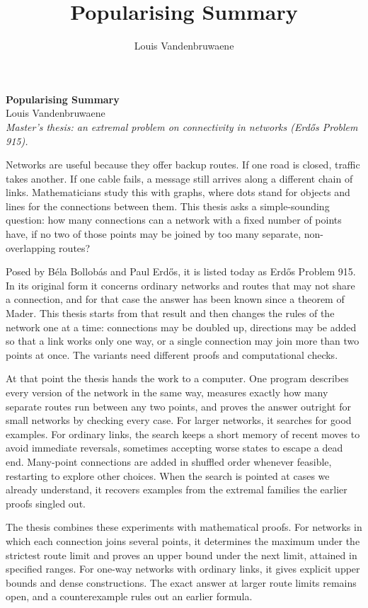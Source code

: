 \documentclass[11pt]{article}
\title{Popularising Summary}
\author{Louis Vandenbruwaene}
\date{}
\begin{document}
{\large\bfseries Popularising Summary}\\[2pt]
{\normalsize Louis Vandenbruwaene}\\[6pt]
\textit{Master's thesis: an extremal problem on connectivity in networks (Erd\H{o}s Problem 915).}

\bigskip

Networks are useful because they offer backup routes. If one road is closed, traffic takes another. If one cable fails, a message still arrives along a different chain of links. Mathematicians study this with graphs, where dots stand for objects and lines for the connections between them. This thesis asks a simple-sounding question: how many connections can a network with a fixed number of points have, if no two of those points may be joined by too many separate, non-overlapping routes?

Posed by B\'{e}la Bollob\'{a}s and Paul Erd\H{o}s, it is listed today as Erd\H{o}s Problem 915. In its original form it concerns ordinary networks and routes that may not share a connection, and for that case the answer has been known since a theorem of Mader. This thesis starts from that result and then changes the rules of the network one at a time: connections may be doubled up, directions may be added so that a link works only one way, or a single connection may join more than two points at once. The variants need different proofs and computational checks.

At that point the thesis hands the work to a computer. One program describes every version of the network in the same way, measures exactly how many separate routes run between any two points, and proves the answer outright for small networks by checking every case. For larger networks, it searches for good examples. For ordinary links, the search keeps a short memory of recent moves to avoid immediate reversals, sometimes accepting worse states to escape a dead end. Many-point connections are added in shuffled order whenever feasible, restarting to explore other choices. When the search is pointed at cases we already understand, it recovers examples from the extremal families the earlier proofs singled out.

The thesis combines these experiments with mathematical proofs. For networks in which each connection joins several points, it determines the maximum under the strictest route limit and proves an upper bound under the next limit, attained in specified ranges. For one-way networks with ordinary links, it gives explicit upper bounds and dense constructions. The exact answer at larger route limits remains open, and a counterexample rules out an earlier formula.
\end{document}
